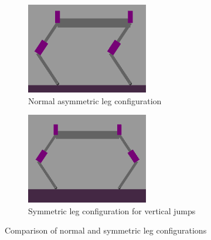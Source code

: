 \begin{figure}[h]
    \centering
    \begin{subfigure}[b]{0.48\textwidth}
        \centering
        \includegraphics[width=\textwidth]{Images/link_length_optimization/asymmetric_legs.png}
        \caption{Normal asymmetric leg configuration}
        \label{fig:link_length_optimization:asymmetric_legs}
    \end{subfigure}
    \hfill
    \begin{subfigure}[b]{0.48\textwidth}
        \centering
        \includegraphics[width=\textwidth]{Images/link_length_optimization/symmetric_legs.png}
        \caption{Symmetric leg configuration for vertical jumps}
        \label{fig:link_length_optimization:symmetric_legs}
    \end{subfigure}
    \caption{Comparison of normal and symmetric leg configurations}
    \label{fig:link_length_optimization:flipped_legs}
\end{figure}


